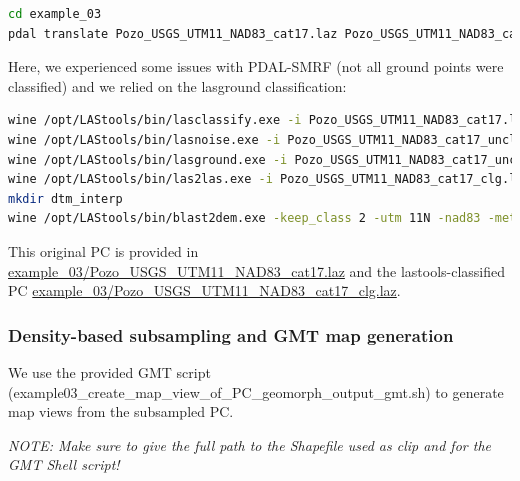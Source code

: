 \documentclass[a4paperpaper,,tablecaptionabove]{scrartcl}
\begin{document}
\begin{lstlisting}[language=bash]
cd example_03
pdal translate Pozo_USGS_UTM11_NAD83_cat17.laz Pozo_USGS_UTM11_NAD83_cat17_SMRF_cl2.las --json example03_PDAL_SMRF_pipeline.json
\end{lstlisting}

Here, we experienced some issues with PDAL-SMRF (not all ground points
were classified) and we relied on the lasground classification:

\begin{lstlisting}[language=bash]
wine /opt/LAStools/bin/lasclassify.exe -i Pozo_USGS_UTM11_NAD83_cat17.laz -olaz -set_user_data 0 -set_classification 0 -o Pozo_USGS_UTM11_NAD83_cat17_uncl.laz
wine /opt/LAStools/bin/lasnoise.exe -i Pozo_USGS_UTM11_NAD83_cat17_uncl.laz -step_xy 2 -step_z 1 -isolated 5 -olaz -o Pozo_USGS_UTM11_NAD83_cat17_uncln.laz
wine /opt/LAStools/bin/lasground.exe -i Pozo_USGS_UTM11_NAD83_cat17_uncln.laz -by_flightline -wilderness -extra_fine -offset 0.25 -stddev 20 -step 1 -spike 0.5 -bulge 0.5 -olaz -o Pozo_USGS_UTM11_NAD83_cat17_clg.laz 
wine /opt/LAStools/bin/las2las.exe -i Pozo_USGS_UTM11_NAD83_cat17_clg.laz -keep_class 2 -olaz -o Pozo_USGS_UTM11_NAD83_cat17_clg_cl2.laz 
mkdir dtm_interp
wine /opt/LAStools/bin/blast2dem.exe -keep_class 2 -utm 11N -nad83 -meter -elevation_meter -merged -step 1 -i Pozo_USGS_UTM11_NAD83_cat17_clg_cl2.laz -o dtm_interp/Pozo_USGS_UTM11_NAD83_cat17_clg_cl2_1m.tif
\end{lstlisting}

This original PC is provided in
\href{https://github.com/BodoBookhagen/PC_geomorph_roughness/blob/master/example_03/Pozo_USGS_UTM11_NAD83_cat17.laz}{example\_03/Pozo\_USGS\_UTM11\_NAD83\_cat17.laz}
and the lastools-classified PC
\href{https://github.com/BodoBookhagen/PC_geomorph_roughness/blob/master/example_03/Pozo_USGS_UTM11_NAD83_cat17_clg.laz}{example\_03/Pozo\_USGS\_UTM11\_NAD83\_cat17\_clg.laz}.

\hypertarget{density-based-subsampling-and-gmt-map-generation}{%
\subsubsection{Density-based subsampling and GMT map
generation}\label{density-based-subsampling-and-gmt-map-generation}}

We use the provided GMT script
(example03\_create\_map\_view\_of\_PC\_geomorph\_output\_gmt.sh) to
generate map views from the subsampled PC.

\emph{NOTE: Make sure to give the full path to the Shapefile used as
clip and for the GMT Shell script!}
\end{document}
